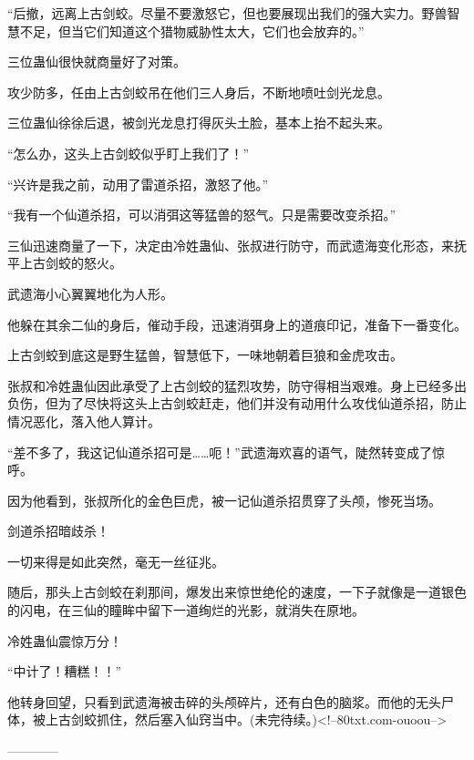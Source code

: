 \begin{this_body}
“后撤，远离上古剑蛟。尽量不要激怒它，但也要展现出我们的强大实力。野兽智慧不足，但当它们知道这个猎物威胁性太大，它们也会放弃的。”

三位蛊仙很快就商量好了对策。

攻少防多，任由上古剑蛟吊在他们三人身后，不断地喷吐剑光龙息。

三位蛊仙徐徐后退，被剑光龙息打得灰头土脸，基本上抬不起头来。

“怎么办，这头上古剑蛟似乎盯上我们了！”

“兴许是我之前，动用了雷道杀招，激怒了他。”

“我有一个仙道杀招，可以消弭这等猛兽的怒气。只是需要改变杀招。”

三仙迅速商量了一下，决定由冷姓蛊仙、张叔进行防守，而武遗海变化形态，来抚平上古剑蛟的怒火。

武遗海小心翼翼地化为人形。

他躲在其余二仙的身后，催动手段，迅速消弭身上的道痕印记，准备下一番变化。

上古剑蛟到底这是野生猛兽，智慧低下，一味地朝着巨狼和金虎攻击。

张叔和冷姓蛊仙因此承受了上古剑蛟的猛烈攻势，防守得相当艰难。身上已经多出负伤，但为了尽快将这头上古剑蛟赶走，他们并没有动用什么攻伐仙道杀招，防止情况恶化，落入他人算计。

“差不多了，我这记仙道杀招可是……呃！”武遗海欢喜的语气，陡然转变成了惊呼。

因为他看到，张叔所化的金色巨虎，被一记仙道杀招贯穿了头颅，惨死当场。

剑道杀招暗歧杀！

一切来得是如此突然，毫无一丝征兆。

随后，那头上古剑蛟在刹那间，爆发出来惊世绝伦的速度，一下子就像是一道银色的闪电，在三仙的瞳眸中留下一道绚烂的光影，就消失在原地。

冷姓蛊仙震惊万分！

“中计了！糟糕！！”

他转身回望，只看到武遗海被击碎的头颅碎片，还有白色的脑浆。而他的无头尸体，被上古剑蛟抓住，然后塞入仙窍当中。(未完待续。)<!--80txt.com-ouoou-->

------------

\end{this_body}

